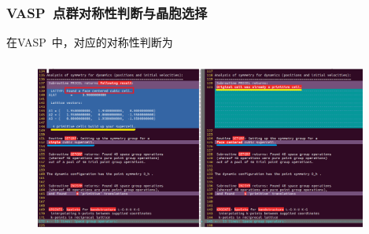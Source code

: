 \documentclass[cjk,slidestop,handout,compress,mathserif,blue]{beamer}	%
\newcommand{\upcite}[1]{\hspace{0ex}\textsuperscript{\cite{#1}}} %
\begin{document}

%
\frame
{
	\frametitle{\textrm{VASP~}点群对称性判断与晶胞选择}
	在\textrm{VASP~}中，对应的对称性判断为
\begin{figure}[h!]
\centering
\vspace*{-0.1in}
\hspace*{-0.15in}
\includegraphics[height=2.3in,width=4.3in,viewport=0 0 1080 530,clip]{Figures/VASP_FCC_Si_symmetry.png}
\label{FCC_Si-OUTCAR}
\end{figure} 
}
\end{document}
